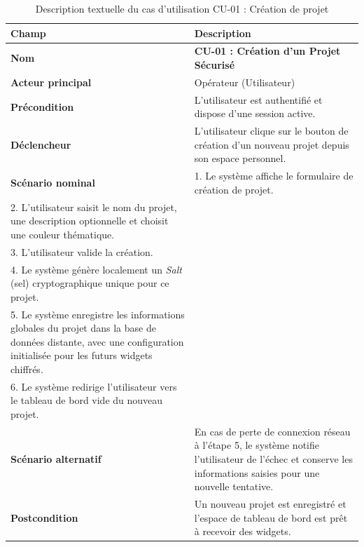 ﻿\documentclass[12pt,a4paper,oneside]{report} %
\begin{document}
\begin{table}[H]
\centering
\begin{tabularx}{\textwidth}{|l|X|}
\hline
\textbf{Champ} & \textbf{Description} \\ \hline
\textbf{Nom} & \textbf{CU-01 : Création d'un Projet Sécurisé} \\ \hline
\textbf{Acteur principal} & Opérateur (Utilisateur) \\ \hline
\textbf{Précondition} & L'utilisateur est authentifié et dispose d'une session active. \\ \hline
\textbf{Déclencheur} & L'utilisateur clique sur le bouton de création d'un nouveau projet depuis son espace personnel. \\ \hline
\textbf{Scénario nominal} & 
1. Le système affiche le formulaire de création de projet.\\
2. L'utilisateur saisit le nom du projet, une description optionnelle et choisit une couleur thématique.\\
3. L'utilisateur valide la création.\\
4. Le système génère localement un \textit{Salt} (sel) cryptographique unique pour ce projet.\\
5. Le système enregistre les informations globales du projet dans la base de données distante, avec une configuration initialisée pour les futurs widgets chiffrés.\\
6. Le système redirige l'utilisateur vers le tableau de bord vide du nouveau projet. \\ \hline
\textbf{Scénario alternatif} & En cas de perte de connexion réseau à l'étape 5, le système notifie l'utilisateur de l'échec et conserve les informations saisies pour une nouvelle tentative. \\ \hline
\textbf{Postcondition} & Un nouveau projet est enregistré et l'espace de tableau de bord est prêt à recevoir des widgets. \\ \hline
\end{tabularx}
\caption{Description textuelle du cas d'utilisation CU-01 : Création de projet}
\end{table}
\end{document}
